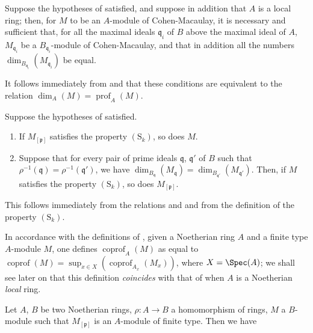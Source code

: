 
\begin{corollary}[5.7.10]
\label{IV.5.7.10}
Suppose the hypotheses of  satisfied, and suppose in addition that $A$ is a local ring; then, for $M$ to be an $A$-module of Cohen-Macaulay, it is necessary and sufficient that, for all the maximal ideals $\mathfrak{q}_i$ of $B$ above the maximal ideal of $A$, $M_{\mathfrak{q}_i}$ be a $B_{\mathfrak{q}_i}$-module of Cohen-Macaulay, and that in addition all the numbers $\dim_{B_{\mathfrak{q}_i}}(M_{\mathfrak{q}_i})$ be equal.
\end{corollary}

It follows immediately from  and  that these conditions are equivalent to the relation $\dim_A(M)=\operatorname{prof}_A(M)$.

\begin{corollary}[5.7.11]
\label{IV.5.7.11}
Suppose the hypotheses of  satisfied.
\begin{enumerate}[label=\emph{\roman*)}]
  \item If $M_{[\mathfrak{p}]}$ satisfies the property $(\mathrm{S}_k)$, so does $M$.
  \item Suppose that for every pair of prime ideals $\mathfrak{q}$, $\mathfrak{q}'$ of $B$ such that $\rho^{-1}(\mathfrak{q})=\rho^{-1}(\mathfrak{q}')$, we have $\dim_{B_\mathfrak{q}}(M_\mathfrak{q})=\dim_{B_{\mathfrak{q}'}}(M_{\mathfrak{q}'})$.
Then, if $M$ satisfies the property $(\mathrm{S}_k)$, so does $M_{[\mathfrak{p}]}$.
\end{enumerate}
\end{corollary}

This follows immediately from the relations  and  and from the definition of the property $(\mathrm{S}_k)$.

\begin{env}[5.7.12]
\label{IV.5.7.12}
In accordance with the definitions of , given a Noetherian ring $A$ and a finite type $A$-module $M$, one defines $\operatorname{coprof}_A(M)$ as equal to $\operatorname{coprof}(M)=\sup_{x\in X}(\operatorname{coprof}_{A_x}(M_x))$, where $X=\Spec(A)$; we shall see later on  that this definition \emph{coincides} with that of  when $A$ is a Noetherian \emph{local} ring.
\end{env}

\begin{corollary}[5.7.13]
\label{IV.5.7.13}
Let $A$, $B$ be two Noetherian rings, $\rho:A\to B$ a homomorphism of rings, $M$ a $B$-module such that $M_{[\mathfrak{p}]}$ is an $A$-module of finite type.
Then we have
\end{corollary}

